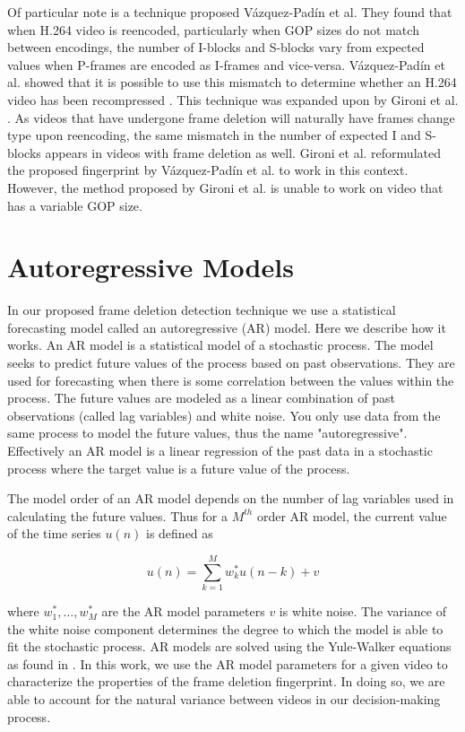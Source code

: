 Of particular note is a technique proposed V\'azquez-Pad\'in et al. \cite{Vazquez} They found that when H.264 video is reencoded, particularly when GOP sizes do not match between encodings, the number of I-blocks and S-blocks vary from expected values when P-frames are encoded as I-frames and vice-versa. V\'azquez-Pad\'in et al. showed that it is possible to use this mismatch to determine whether an H.264 video has been recompressed \cite{Vazquez}. This technique was expanded upon by Gironi et al. \cite{barni}. As videos that have undergone frame deletion will naturally have frames change type upon reencoding, the same mismatch in the number of expected I and S-blocks appears in videos with frame deletion as well. Gironi et al. reformulated the proposed fingerprint by V\'azquez-Pad\'in et al. to work in this context. However, the method proposed by Gironi et al. is unable to work on video that has a variable GOP size.

\section{Autoregressive Models}

In our proposed frame deletion detection technique we use a statistical forecasting model called an autoregressive (AR) model. Here we describe how it works. An AR model is a statistical model of a stochastic process. The model seeks to predict future values of the process based on past observations. They are used for forecasting when there is some correlation between the values within the process. The future values are modeled as a linear combination of past observations (called lag variables) and white noise. You only use data from the same process to model the future values, thus the name "autoregressive". Effectively an AR model is a linear regression of the past data in a stochastic process where the target value is a future value of the process.

The model order of an AR model depends on the number of lag variables used in calculating the future values. Thus for a $M^{th}$ order AR model, the current value of the time series $u(n)$ is defined as

\begin{equation}
u(n) = \sum_{k = 1}^{M} w^{*}_{k} u(n-k) + v
\end{equation}

where $w^{*}_{1}, \dots, w^{*}_{M}$ are the AR model parameters $v$ is white noise. The variance of the white noise component determines the degree to which the model is able to fit the stochastic process. AR models are solved using the Yule-Walker equations as found in \cite{ARmodels}. In this work, we use the AR model parameters for a given video to characterize the properties of the frame deletion fingerprint. In doing so, we are able to account for the natural variance between videos in our decision-making process.

